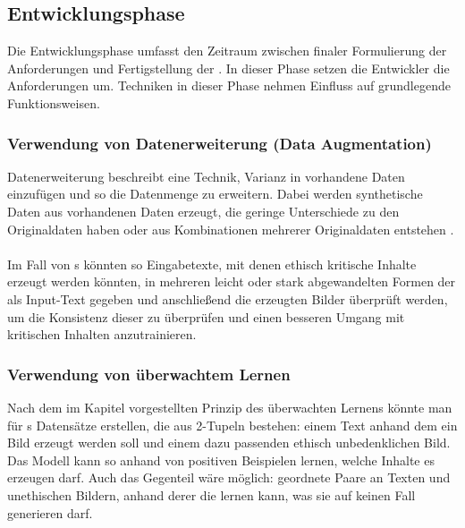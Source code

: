 \documentclass[hidelinks,12pt]{report}
\begin{document}
\subsection{Entwicklungsphase}
Die Entwicklungsphase umfasst den Zeitraum zwischen finaler Formulierung der Anforderungen und Fertigstellung der . In dieser Phase setzen die Entwickler die Anforderungen um. Techniken in dieser Phase nehmen Einfluss auf grundlegende Funktionsweisen.

\subsubsection{Verwendung von Datenerweiterung (Data Augmentation)}
Datenerweiterung beschreibt eine Technik, Varianz in vorhandene Daten einzufügen und so die Datenmenge zu erweitern. Dabei werden synthetische Daten aus vorhandenen Daten erzeugt, die geringe Unterschiede zu den Originaldaten haben oder aus Kombinationen mehrerer Originaldaten entstehen \cite[S. 2]{Shorten}. 
\\\\
Im Fall von s könnten so Eingabetexte, mit denen ethisch kritische Inhalte erzeugt werden könnten, in mehreren leicht oder stark abgewandelten Formen der  als Input-Text gegeben und anschließend die erzeugten Bilder überprüft werden, um die Konsistenz dieser zu überprüfen und einen besseren Umgang mit kritischen Inhalten anzutrainieren.  
\\
\subsubsection{Verwendung von überwachtem Lernen}\label{Supervised Learning}
Nach dem im Kapitel  vorgestellten Prinzip des überwachten Lernens könnte man für s Datensätze erstellen, die aus 2-Tupeln bestehen: einem Text anhand dem ein Bild erzeugt werden soll und einem dazu passenden ethisch unbedenklichen Bild. Das Modell kann so anhand von positiven Beispielen lernen, welche Inhalte es erzeugen darf. Auch das Gegenteil wäre möglich: geordnete Paare an Texten und unethischen Bildern, anhand derer die  lernen kann, was sie auf keinen Fall generieren darf.
\\
\end{document}
